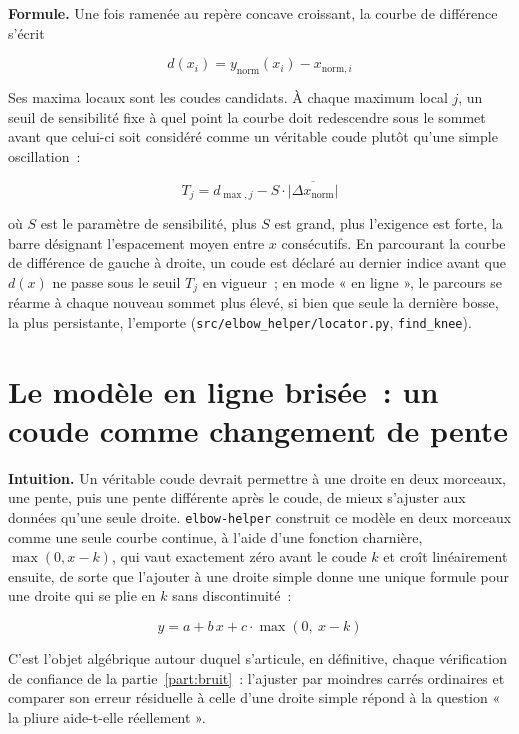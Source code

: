 \documentclass[11pt]{article}
\newcommand{\code}[1]{\texttt{#1}}
\begin{document}
\textbf{Formule.} Une fois ramenée au repère concave croissant, la courbe
de différence s'écrit

\begin{equation}
d(x_i) = y_{\text{norm}}(x_i) - x_{\text{norm}, i}
\end{equation}

Ses maxima locaux sont les coudes candidats. À chaque maximum local $j$, un
seuil de sensibilité fixe à quel point la courbe doit redescendre sous le
sommet avant que celui-ci soit considéré comme un véritable coude plutôt
qu'une simple oscillation~:

\begin{equation}
T_j = d_{\max, j} - S \cdot \overline{|\Delta x_{\text{norm}}|}
\end{equation}

où $S$ est le paramètre de sensibilité, plus $S$ est grand, plus l'exigence
est forte, la barre désignant l'espacement moyen entre $x$ consécutifs. En
parcourant la courbe de différence de gauche à droite, un coude est déclaré
au dernier indice avant que $d(x)$ ne passe sous le seuil $T_j$ en vigueur~;
en mode « en ligne », le parcours se réarme à chaque nouveau sommet plus
élevé, si bien que seule la dernière bosse, la plus persistante, l'emporte
(\code{src/elbow\_helper/locator.py}, \code{find\_knee}).

\section{Le modèle en ligne brisée~: un coude comme changement de pente}

\textbf{Intuition.} Un véritable coude devrait permettre à une droite en
deux morceaux, une pente, puis une pente différente après le coude, de
mieux s'ajuster aux données qu'une seule droite. \code{elbow-helper}
construit ce modèle en deux morceaux comme une seule courbe continue, à
l'aide d'une fonction charnière, $\max(0, x - k)$, qui vaut exactement zéro
avant le coude $k$ et croît linéairement ensuite, de sorte que l'ajouter à
une droite simple donne une unique formule pour une droite qui se plie en
$k$ sans discontinuité~:

\begin{equation}
y = a + b\,x + c \cdot \max(0,\ x - k)
\end{equation}

C'est l'objet algébrique autour duquel s'articule, en définitive, chaque
vérification de confiance de la partie~\ref{part:bruit}~: l'ajuster par
moindres carrés ordinaires et comparer son erreur résiduelle à celle d'une
droite simple répond à la question « la pliure aide-t-elle réellement ».
\end{document}
